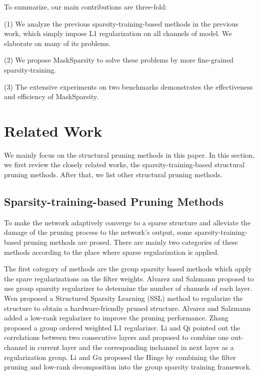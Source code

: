 \documentclass[review]{cvpr}
\begin{document}
To summarize, our main contributions are three-fold:

(1)	We analyze the previous sparsity-training-based methods in the previous work, which simply impose L1 regularization on all channels of model. We elaborate on many of its problems.

(2)	We propose MaskSparsity to solve these problems by more fine-grained sparsity-training.

(3)	The extensive experiments on two benchmarks demonstrates the effectiveness and efficiency of MaskSparsity.



\section{Related Work}
We mainly focus on the structural pruning methods in this paper.
In this section, we first review the closely related works, \ie the sparsity-training-based structural pruning methods. After that, we list other structural pruning methods.

\subsection{Sparsity-training-based Pruning Methods}
To make the network adaptively converge to a sparse structure and alleviate the damage of the pruning process to the network's output, some sparsity-training-based pruning methods are prosed. There are mainly two categories of these methods according to the place where sparse regularization is applied. 

The first category of methods are the group sparsity based methods which apply the spare regularizations on the filter weights. Alvarez and Salzmann \cite{alvarez2016learning} proposed to use group sparsity regularizer to determine the number of channels of each layer. Wen \etal \cite{wen2016learning} proposed a Structured Sparsity Learning (SSL) method to regularize the structure to obtain a hardware-friendly pruned structure.  Alvarez and Salzmann \cite{alvarez2017compression} added a low-rank regularizer to improve the pruning performance. Zhang \etal proposed a group ordered weighted L1 regularizer. Li and Qi \cite{OICSROS} pointed out the correlations between two consecutive layers and proposed to combine one out-channel in current layer and the corresponding inchannel in next layer as a regularization group. Li and Gu proposed the Hinge \cite{Hinge} by combining the filter pruning and low-rank decomposition into the group sparsity training framework.
\end{document}
